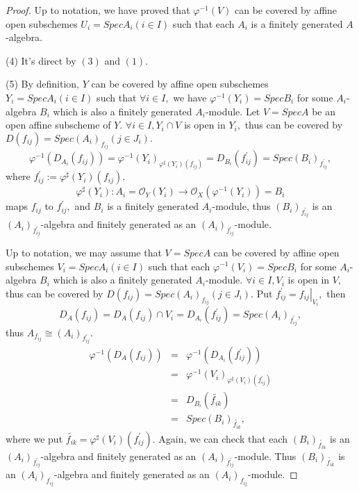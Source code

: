 \begin{proof}
Up to notation, we have proved that $\varphi^{-1}(V)$ can be covered
by affine open subschemes $U_i=SpecA_i(i\in I)$ such that each $A_i$
is a finitely generated $A$-algebra.
\item[(4)]It's direct by $(3)$ and $(1).$
\item[(5)]By definition, $Y$ can be covered by
affine open subschemes $Y_i=SpecA_i(i\in I)$ such that $\forall i\in
I,$ we have $\varphi^{-1}(Y_i)=SpecB_i$ for some $A_i$-algebra $B_i$
which is also a finitely generated $A_i$-module. Let $V=SpecA$ be an
open affine subscheme of $Y.$ $\forall i\in I, Y_i\cap V$ is open in
$Y_i,$ thus can be covered by $D(f_{ij})=Spec(A_i)_{f_{ij}}(j\in
J_i).$
$$\varphi^{-1}(D_{A_i}(f_{ij}))=\varphi^{-1}(Y_i)_{\varphi^{\sharp}(Y_i)(f_{ij})}=
D_{B_i}(f_{ij}^{\prime})=Spec(B_i)_{f_{ij}^{\prime}},$$ where
$f_{ij}^{\prime}:=\varphi^{\sharp}(Y_i)(f_{ij}).$
$$\varphi^{\sharp}(Y_i): A_i=\mathcal {O}_Y(Y_i)\rightarrow\mathcal {O}_X(\varphi^{-1}(Y_i))=B_i$$
maps $f_{ij}$ to $f_{ij}^{\prime},$ and $B_i$ is a finitely
generated $A_i$-module, thus $(B_i)_{f_{ij}^{\prime}}$ is an
$(A_i)_{f_{ij}^{\prime}}$-algebra and finitely generated as an
$(A_i)_{f_{ij}^{\prime}}$-module.

Up to notation, we may assume that $V=SpecA$ can be covered by
affine open subschemes $V_i=SpecA_i(i\in I)$ such that each
$\varphi^{-1}(V_i)=SpecB_i$ for some $A_i$-algebra $B_i$ which is
also a finitely generated $A_i$-module. $\forall i\in I, V_i$ is
open in $V,$ thus can be covered by
$D(f_{ij})=Spec(A_i)_{f_{ij}}(j\in J_i).$ Put
$f_{ij}^{\prime}=\left.f_{ij}\right|_{V_i},$ then
$$D_A(f_{ij})=D_A(f_{ij})\cap V_i=D_{A_i}(f_{ij}^{\prime})=Spec(A_i)_{f_{ij}^{\prime}},$$
thus $A_{f_{ij}}\cong (A_i)_{f_{ij}^{\prime}}.$
\begin{eqnarray*}
\varphi^{-1}(D_A(f_{ij})) & = &
\varphi^{-1}(D_{A_i}(f_{ij}^{\prime}))                          \\
& = & \varphi^{-1}(V_i)_{\varphi^{\sharp}(V_i)(f_{ij}^{\prime})}\\
& = & D_{B_i}(\widetilde{f_{ik}})                               \\
& = & Spec(B_i)_{\widetilde{f_{ik}}},
\end{eqnarray*}
where we put
$\widetilde{f_{ik}}=\varphi^{\sharp}(V_i)(f_{ij}^{\prime}).$ Again,
we can check that each $(B_i)_{\widetilde{f_{ik}}}$ is an
$(A_i)_{f_{ij}^{\prime}}$-algebra and finitely generated as an
$(A_i)_{f_{ij}^{\prime}}$-module. Thus $(B_i)_{\widetilde{f_{ik}}}$
is an $(A_i)_{f_{ij}}$-algebra and finitely generated as an
$(A_i)_{f_{ij}}$-module.


\end{proof}
